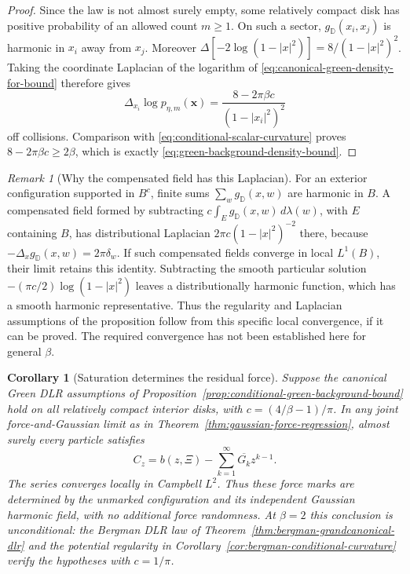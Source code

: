 \documentclass[11pt,a4paper]{article}
\numberwithin{equation}{section}
\newtheorem{corollary}[theorem]{Corollary}
\theoremstyle{definition}
\theoremstyle{remark}
\newtheorem{remark}[theorem]{Remark}
\newcommand{\D}{\mathbb D}
\begin{document}
\begin{proof}
Since the law is not almost surely empty, some relatively compact
disk has positive probability of an allowed count $m\ge1$. On such
a sector, $g_{\D}(x_i,x_j)$ is harmonic in $x_i$ away from $x_j$.
Moreover
$\Delta[-2\log(1-|x|^2)]=8/(1-|x|^2)^2$.
Taking the coordinate Laplacian of the logarithm of
\eqref{eq:canonical-green-density-for-bound} therefore gives
\[
 \Delta_{x_i}\log p_{\eta,m}(\mathbf x)
   =\frac{8-2\pi\beta c}{(1-|x_i|^2)^2}
\]
off collisions. Comparison with
\eqref{eq:conditional-scalar-curvature} proves
$8-2\pi\beta c\ge2\beta$, which is exactly
\eqref{eq:green-background-density-bound}.
\end{proof}

\begin{remark}[Why the compensated field has this Laplacian]
For an exterior configuration supported in $B^c$, finite sums
$\sum_w g_{\D}(x,w)$ are harmonic in $B$. A compensated field formed
by subtracting $c\int_Eg_{\D}(x,w)\,d\lambda(w)$, with $E$
containing $B$, has distributional Laplacian
$2\pi c(1-|x|^2)^{-2}$ there, because
$-\Delta_xg_{\D}(x,w)=2\pi\delta_w$. If such compensated fields
converge in local $L^1(B)$, their limit retains this identity.
Subtracting the smooth particular solution
$-(\pi c/2)\log(1-|x|^2)$ leaves a distributionally harmonic
function, which has a smooth harmonic representative. Thus the
regularity and Laplacian assumptions of the proposition follow from
this specific local convergence, if it can be proved. The required
convergence has not been established here for general $\beta$.
\end{remark}

\begin{corollary}[Saturation determines the residual force]
\label{cor:conditional-green-force-saturation}
Suppose the canonical Green DLR assumptions of
Proposition~\ref{prop:conditional-green-background-bound} hold on
all relatively compact interior disks, with
$c=(4/\beta-1)/\pi$. In any joint force-and-Gaussian limit as in
Theorem~\ref{thm:gaussian-force-regression}, almost surely every
particle satisfies
\begin{equation}\label{eq:saturated-force-decomposition}
 C_z=b(z,\Xi)-\sum_{k=1}^\infty\overline{G_k}z^{k-1}.
\end{equation}
The series converges locally in Campbell $L^2$. Thus these force marks
are determined by the unmarked configuration and its independent
Gaussian harmonic field, with no additional force randomness.
At $\beta=2$ this conclusion is unconditional: the Bergman DLR law
of Theorem~\ref{thm:bergman-grandcanonical-dlr} and the potential
regularity in Corollary~\ref{cor:bergman-conditional-curvature}
verify the hypotheses with $c=1/\pi$.
\end{corollary}
\end{document}
